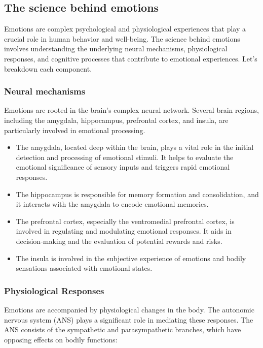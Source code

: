 \subsection{The science behind emotions}
Emotions are complex psychological and physiological experiences that play a crucial role in human behavior and well-being. 
The science behind emotions involves understanding the underlying neural mechanisms, physiological responses, 
and cognitive processes that contribute to emotional experiences. Let's breakdown each component.

\subsubsection{Neural mechanisms}
Emotions are rooted in the brain's complex neural network. Several brain regions, including the amygdala, 
hippocampus, prefrontal cortex, and insula, are particularly involved in emotional processing.

\begin{itemize}
    \item The amygdala, located deep within the brain, plays a vital role in the initial detection and processing of emotional stimuli. 
    It helps to evaluate the emotional significance of sensory inputs and triggers rapid emotional responses.
    \item The hippocampus is responsible for memory formation and consolidation, and it interacts with the amygdala to encode emotional memories.
    \item The prefrontal cortex, especially the ventromedial prefrontal cortex, is involved in regulating and modulating emotional responses.
    It aids in decision-making and the evaluation of potential rewards and risks.
    \item The insula is involved in the subjective experience of emotions and bodily sensations associated with emotional states.
\end{itemize}

\subsubsection{Physiological Responses}
Emotions are accompanied by physiological changes in the body. 
The autonomic nervous system (ANS) plays a significant role in mediating these responses. 
The ANS consists of the sympathetic and parasympathetic branches, which have opposing effects on bodily functions:

